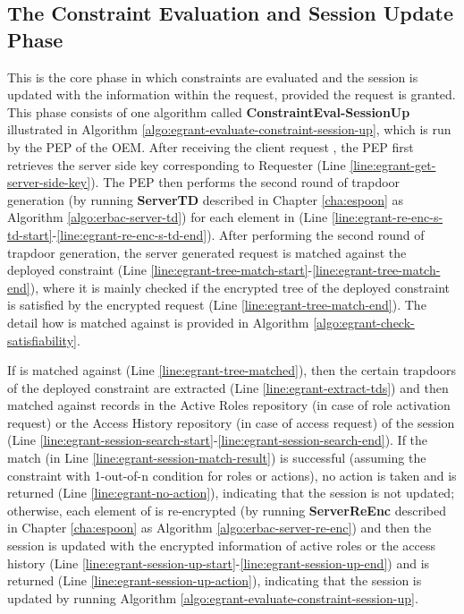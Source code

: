 \documentclass[epsfig,a4paper,11pt,titlepage]{book}
\numberwithin{algorithm}{chapter}
\begin{document}
\subsection{The Constraint Evaluation and Session Update Phase}
This is the core phase in which constraints are evaluated and the session is updated with the information within the request, provided the request is granted. This phase consists of one algorithm called \textbf{ConstraintEval-SessionUp} illustrated in Algorithm \ref{algo:egrant-evaluate-constraint-session-up}, which is run by the \gls{PEP} of the \gls{OEM}. After receiving the client request , the \gls{PEP} first retrieves the server side key  corresponding to Requester  (Line \ref{line:egrant-get-server-side-key}). The \gls{PEP} then performs the second round of trapdoor generation (by running \textbf{ServerTD} described in Chapter \ref{cha:espoon} as Algorithm \ref{algo:erbac-server-td}) for each element in  (Line \ref{line:egrant-re-enc-s-td-start}-\ref{line:egrant-re-enc-s-td-end}). After performing the second round of trapdoor generation, the server generated request  is matched against the deployed constraint  (Line \ref{line:egrant-tree-match-start}-\ref{line:egrant-tree-match-end}), where it is mainly checked if the encrypted tree  of the deployed constraint  is satisfied by the encrypted request  (Line \ref{line:egrant-tree-match-end}). The detail how  is matched against  is provided in Algorithm \ref{algo:egrant-check-satisfiability}.

If  is matched against  (Line \ref{line:egrant-tree-matched}), then the certain trapdoors of the deployed constraint are extracted (Line \ref{line:egrant-extract-tds}) and then matched against records in the Active Roles repository (in case of role activation request) or the Access History repository (in case of access request) of the session (Line \ref{line:egrant-session-search-start}-\ref{line:egrant-session-search-end}). If the match (in Line \ref{line:egrant-session-match-result}) is successful (assuming the constraint with 1-out-of-n condition for roles or actions), no action is taken and  is returned (Line \ref{line:egrant-no-action}), indicating that the session is not updated; otherwise, each element of  is re-encrypted (by running \textbf{ServerReEnc} described in Chapter \ref{cha:espoon} as Algorithm \ref{algo:erbac-server-re-enc}) and then the session is updated with the encrypted information of active roles or the access history (Line \ref{line:egrant-session-up-start}-\ref{line:egrant-session-up-end}) and  is returned (Line \ref{line:egrant-session-up-action}), indicating that the session is updated by running Algorithm \ref{algo:egrant-evaluate-constraint-session-up}.
\end{document}
